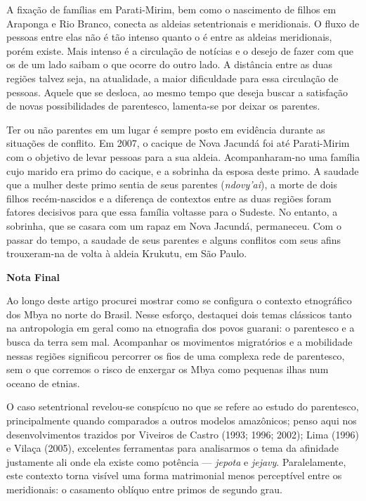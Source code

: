 A fixação de famílias em Parati-Mirim, bem como o nascimento de filhos
em Araponga e Rio Branco, conecta as aldeias setentrionais e
meridionais. O fluxo de pessoas entre elas não é tão intenso quanto o é
entre as aldeias meridionais, porém existe. Mais intenso é a circulação
de notícias e o desejo de fazer com que os de um lado saibam o que
ocorre do outro lado. A distância entre as duas regiões talvez seja, na
atualidade, a maior dificuldade para essa circulação de pessoas. Aquele
que se desloca, ao mesmo tempo que deseja buscar a satisfação de novas
possibilidades de parentesco, lamenta-se por deixar os parentes.

Ter ou não parentes em um lugar é sempre posto em evidência durante as
situações de conflito. Em 2007, o cacique de Nova Jacundá foi até
Parati-Mirim com o objetivo de levar pessoas para a sua aldeia.
Acompanharam-no uma família cujo marido era primo do cacique, e a
sobrinha da esposa deste primo. A saudade que a mulher deste primo
sentia de seus parentes (\emph{ndovy'ai}), a morte de dois filhos
recém-nascidos e a diferença de contextos entre as duas regiões foram
fatores decisivos para que essa família voltasse para o Sudeste. No
entanto, a sobrinha, que se casara com um rapaz em Nova Jacundá,
permaneceu. Com o passar do tempo, a saudade de seus parentes e alguns
conflitos com seus afins trouxeram-na de volta à aldeia Krukutu, em São
Paulo.

\textbf{Nota Final}

Ao longo deste artigo procurei mostrar como se configura o contexto
etnográfico dos Mbya no norte do Brasil. Nesse esforço, destaquei dois
temas clássicos tanto na antropologia em geral como na etnografia dos
povos guarani: o parentesco e a busca da terra sem mal. Acompanhar os
movimentos migratórios e a mobilidade nessas regiões significou
percorrer os fios de uma complexa rede de parentesco, sem o que corremos
o risco de enxergar os Mbya como pequenas ilhas num oceano de etnias.

O caso setentrional revelou-se conspícuo no que se refere ao estudo do
parentesco, principalmente quando comparados a outros modelos
amazônicos; penso aqui nos desenvolvimentos trazidos por Viveiros de
Castro (1993; 1996; 2002); Lima (1996) e Vilaça (2005), excelentes
ferramentas para analisarmos o tema da afinidade justamente ali onde ela
existe como potência --- \emph{jepota} e \emph{jejavy}. Paralelamente,
este contexto torna visível uma forma matrimonial menos perceptível
entre os meridionais: o casamento oblíquo entre primos de segundo grau.

